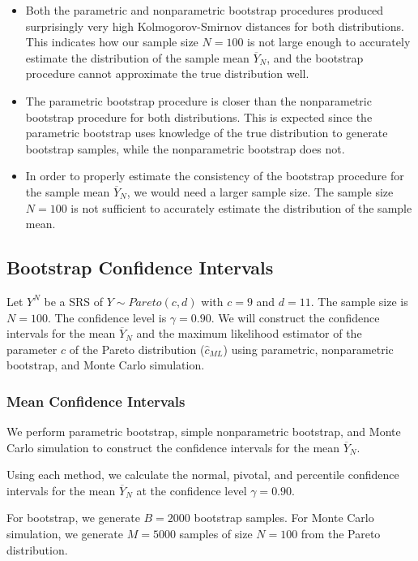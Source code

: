 \documentclass{article}
\begin{document}
\begin{itemize}
    \item Both the parametric and nonparametric bootstrap procedures produced surprisingly very high Kolmogorov-Smirnov distances for both distributions. This indicates how our sample size \(N = 100\) is not large enough to accurately estimate the distribution of the sample mean \(\overline{Y}_N\), and the bootstrap procedure cannot approximate the true distribution well.
    \item The parametric bootstrap procedure is closer than the nonparametric bootstrap procedure for both distributions. This is expected since the parametric bootstrap uses knowledge of the true distribution to generate bootstrap samples, while the nonparametric bootstrap does not.
    \item In order to properly estimate the consistency of the bootstrap procedure for the sample mean \(\overline{Y}_N\), we would need a larger sample size. The sample size \(N = 100\) is not sufficient to accurately estimate the distribution of the sample mean.
\end{itemize}

\subsection{Bootstrap Confidence Intervals}

Let \(Y^N\) be a SRS of \(Y \sim Pareto(c, d)\) with \(c = 9\) and \(d = 11\). The sample size is \(N = 100\). The confidence level is \(\gamma = 0.90\). We will construct the confidence intervals for the mean \(\overline{Y}_N\) and the maximum likelihood estimator of the parameter \(c\) of the Pareto distribution (\(\hat{c}_{ML}\)) using parametric, nonparametric bootstrap, and Monte Carlo simulation.

\subsubsection{Mean Confidence Intervals}

We perform parametric bootstrap, simple nonparametric bootstrap, and Monte Carlo simulation to construct the confidence intervals for the mean \(\overline{Y}_N\).

Using each method, we calculate the normal, pivotal, and percentile confidence intervals for the mean \(\overline{Y}_N\) at the confidence level \(\gamma = 0.90\).

For bootstrap, we generate \(B = 2000\) bootstrap samples. For Monte Carlo simulation, we generate \(M = 5000\) samples of size \(N = 100\) from the Pareto distribution.
\end{document}
